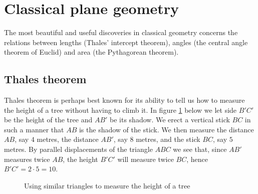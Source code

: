 \section{Classical plane geometry}
The most beautiful and useful discoveries in classical geometry concerns the relations between lengths (Thales’ intercept theorem), angles (the central angle theorem of Euclid) and area (the Pythagorean theorem).

\subsection{Thales theorem}
Thales theorem is perhaps best known for its ability to tell us how to measure the height of a tree without having to climb it. In figure \ref{geo:thales} below we let side $B'C'$ be the height of the tree and $AB'$ be its shadow. We erect a vertical stick $BC$ in such a manner that $AB$ is the shadow of the stick. We then measure the distance $AB$, say $4$ metres, the distance $AB'$, say $8$ metres, and the stick $BC$, say $5$ metres. By parallel displacements of the triangle $ABC$ we see that, since $AB′$ measures twice $AB$, the height $B'C'$ will measure twice $BC$, hence $B'C' = 2 \cdot 5 = 10$.
\begin{figure}[H]
\label{geo:thales}
\centering
{}
\caption{Using similar triangles to measure the height of a tree}
\end{figure}

